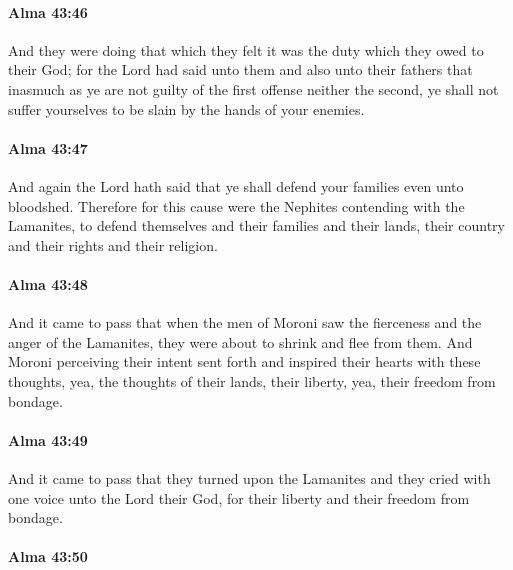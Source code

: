 		\paragraph{Alma 43:46} %
			\label{ALMA-43-46}

			And they were doing that which they felt
			it was the duty which they owed to their God;
			for the Lord had said unto them and also unto their fathers
			that inasmuch as ye are not guilty of the first offense neither the second,
			ye shall not suffer yourselves to be slain by the hands of your enemies.

		\paragraph{Alma 43:47} %
			\label{ALMA-43-47}

			And again the Lord hath said
			that ye shall defend your families even unto bloodshed.
			Therefore for this cause were the Nephites contending with the Lamanites,
			to defend themselves and their families and their lands,
			their country and their rights and their religion.

		\paragraph{Alma 43:48} %
			\label{ALMA-43-48}

			And it came to pass that
			when the men of Moroni saw the fierceness and the anger of the Lamanites,
			they were about to shrink and flee from them.
			And Moroni perceiving their intent
			sent forth and inspired their hearts with these thoughts,
			yea, the thoughts of their lands, their liberty,
			yea, their freedom from bondage.

		\paragraph{Alma 43:49} %
			\label{ALMA-43-49}

			And it came to pass that they turned upon the Lamanites
			and they cried with one voice unto the Lord their God,
			for their liberty and their freedom from bondage.

		\paragraph{Alma 43:50} %
			\label{ALMA-43-50}

